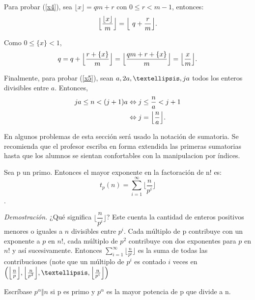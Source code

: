 \begin{thm}
		Para probar (\ref{x4}), sea $\lfloor x \rfloor = qm +r$ con $0 \leq r<m-1$, entonces: 
		\begin{align*}
		\Bigl\lfloor \frac{\lfloor x \rfloor}{m}\Bigr\rfloor = \Bigl\lfloor\ q+ \frac{r}{m} \Bigr\rfloor.  
		\end{align*}
		
		Como $0 \leq \{x\} < 1$,
		\begin{align*}
		q = q + \Bigl\lfloor\frac{r + \{x\}}{m} \Bigr\rfloor = \Bigl\lfloor\frac{qm + r +\{x\}}{m}\Bigr\rfloor = \Bigl\lfloor\frac{x}{m} \Bigr\rfloor. 
		\end{align*} 
		
		Finalmente, para probar (\ref{x5}), sean $a,2a,\textellipsis,ja$ todos los enteros divisibles entre $a$. Entonces,
		\begin{align*}
		ja \leq n < (j+1)a &\Leftrightarrow j \leq \frac{n}{a} < j + 1\\
		&\Leftrightarrow j = \Bigl\lfloor\frac{n}{a}\Bigr\rfloor. 
		\end{align*}
		
		\begin{obs}
			En algunos problemas de esta secci\'on ser\'a usado la notaci\'on de sumatoria. Se recomienda que el profesor escriba en forma extendida las primeras sumatorias hasta que los alumnos se sientan confortables con la manipulacion por \'indices.
		\end{obs}	
	\end{thm}

	
	
	\begin{thm}\label{tp}
		Sea p un primo. Entonces el mayor exponente en la factoraci\'on de n! es:
		$$t_{p}(n) = \sum_{i=1}^{\infty}  \bigg\lfloor\dfrac{n}{p^i}\biggr\rfloor$$.
	\end{thm}
	\textit{Demostraci\'on.} ¿Qu\'e significa $\bigg\lfloor\dfrac{n}{p^i}\biggr\rfloor$? Este cuenta la cantidad de enteros positivos menores o iguales a $n$ divisibles entre $p^{i}$. Cada m\'ultiplo de p contribuye con un exponente a $p$ en $n!$, cada m\'ultiplo de $p^{2}$ contribuye con dos exponentes para $p$ en $n!$ y as\'i sucesivamente. Entonces $\displaystyle\sum_{i = 1}^{\infty} \biggl\lfloor\frac{n}{p^{i}}\biggr\rfloor$ es la suma de todas las contribuciones (note que un m\'ultiplo de $p^{i}$ es contado $i$ veces en $\left(\Bigl\lfloor\tfrac{n}{p}\Bigr\rfloor, \Bigl\lfloor\tfrac{n}{p^2}\Bigr\rfloor,\textellipsis,\Bigl\lfloor\tfrac{n}{p^i}\Bigr\rfloor\right)$ 
	\begin{nt}
		Escr\'ibase $p^{\alpha} \Vert n$ si p es primo y $p^{\alpha}$ es la mayor potencia de p que divide a n. 
	\end{nt}
	
